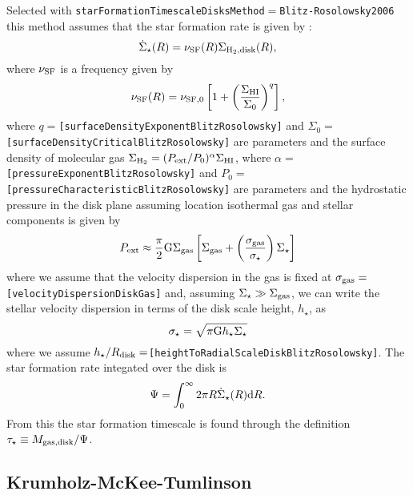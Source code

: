Selected with {\tt starFormationTimescaleDisksMethod}$=${\tt Blitz-Rosolowsky2006} this method assumes that the star formation rate is given by \citep{blitz_role_2006}:
\begin{equation}
 \dot{\Sigma}_\star(R) = \nu_{\rm SF}(R) \Sigma_{\rm H_2, disk}(R),
\end{equation}
where $\nu_{\rm SF}$ is a frequency given by
\begin{equation}
 \nu_{\rm SF}(R) = \nu_{\rm SF,0} \left[ 1 + \left({\Sigma_{\rm HI}\over \Sigma_0}\right)^q \right],
\end{equation}
where $q=${\tt [surfaceDensityExponentBlitzRosolowsky]} and $\Sigma_0=${\tt [surfaceDensityCriticalBlitzRosolowsky]} are parameters and the surface density of molecular gas $\Sigma_{\rm H_2} = (P_{\rm ext}/P_0)^\alpha \Sigma_{\rm HI}$, where $\alpha=${\tt [pressureExponentBlitzRosolowsky]} and $P_0=${\tt [pressureCharacteristicBlitzRosolowsky]} are parameters and the hydrostatic pressure in the disk plane assuming location isothermal gas and stellar components is given by
\begin{equation}
 P_{\rm ext} \approx {\pi\over 2} \G \Sigma_{\rm gas} \left[ \Sigma_{\rm gas} + \left({\sigma_{\rm gas}\over \sigma_\star}\right)\Sigma_\star\right]
\end{equation}
where we assume that the velocity dispersion in the gas is fixed at $\sigma_{\rm gas}=${\tt [velocityDispersionDiskGas]} and, assuming $\Sigma_\star \gg \Sigma_{\rm gas}$, we can write the stellar velocity dispersion in terms of the disk scale height, $h_\star$, as
\begin{equation}
 \sigma_\star = \sqrt{\pi \G h_\star \Sigma_\star}
\end{equation}
where we assume $h_\star/R_{\rm disk}=${\tt [heightToRadialScaleDiskBlitzRosolowsky]}. The star formation rate integated over the disk is
\begin{equation}
 \Psi = \int_0^\infty 2 \pi R \dot{\Sigma}_\star(R) \d R.
\end{equation}
From this the star formation timescale is found through the definition $\tau_\star \equiv M_{\rm gas, disk}/\Psi$.

\subsection{Krumholz-McKee-Tumlinson}\label{sec:StarFormationKMT09}


